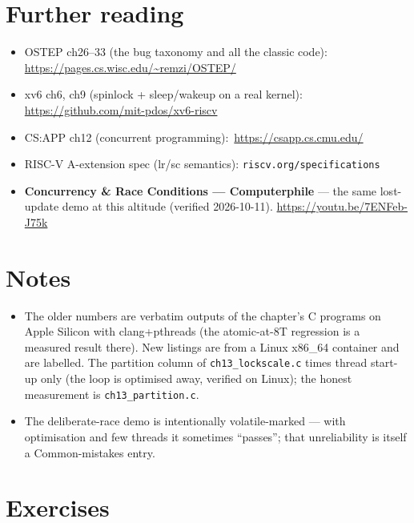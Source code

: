 \section*{Further reading}
\label{sec:further13}
\begin{itemize}
\item OSTEP ch26--33 (the bug taxonomy and all the classic code):
      \url{https://pages.cs.wisc.edu/~remzi/OSTEP/}
\item xv6 ch6, ch9 (spinlock + sleep/wakeup on a real kernel):
      \url{https://github.com/mit-pdos/xv6-riscv}
\item CS:APP ch12 (concurrent programming):\ \url{https://csapp.cs.cmu.edu/}
\item RISC-V A-extension spec (lr/sc semantics): \texttt{riscv.org/specifications}
\end{itemize}

\begin{rulebox}
\begin{itemize}
\item \textbf{Concurrency \& Race Conditions --- Computerphile}
      --- the same lost-update demo at this altitude
      (verified 2026-10-11).
      \url{https://youtu.be/7ENFeb-J75k}
\end{itemize}
\end{rulebox}

\section*{Notes}
\label{sec:notes13}
\begin{itemize}
\item The older numbers are verbatim outputs of the chapter's C
      programs on Apple Silicon with clang+pthreads (the atomic-at-8T
      regression is a measured result there). New listings are from a
      Linux x86\_64 container and are labelled. The partition column
      of \texttt{ch13\_lockscale.c} times thread start-up only (the
      loop is optimised away, verified on Linux); the honest
      measurement is \texttt{ch13\_partition.c}.
\item The deliberate-race demo is intentionally volatile-marked ---
      with optimisation and few threads it sometimes ``passes'';
      that unreliability is itself a Common-mistakes entry.
\end{itemize}

\section*{Exercises}

